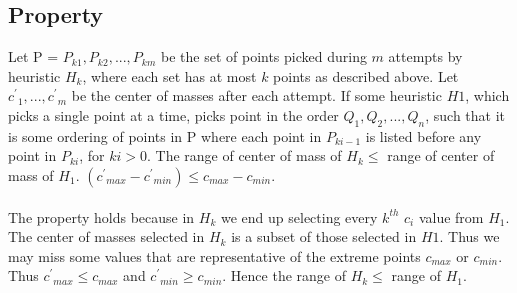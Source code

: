 \documentclass[11pt]{article} %
\begin{document}
\subsection{Property}
Let P = $P_{k1}, P_{k2}, ..., P_{km}$ be the set of points picked during $m$ attempts by heuristic $H_k$, where each set has at most $k$ points as described above. Let ${c^\prime}_1, ... , {c^\prime}_m$ be the center of masses after each attempt.  If some heuristic $H1$, which picks a single point at a time, picks point in the order $Q_1, Q_2, ... ,Q_n$, such that it is  some ordering of points in P where each point in $P_{ki-1}$ is listed before any point in $P_{ki}$, for $ki > 0$. The range of center of mass of $H_k \leq$ range of center of mass of $H_1$. $\left( {c^\prime}_{max} - {c^\prime}_{min} \right) \leq c_{max} - c_{min}.$ \\
\\
The property holds because in $H_k$ we end up selecting every $k^{th}$  $c_i$ value from $H_1$. The center of masses selected in $H_k$ is a subset of those selected in $H1$. Thus we may miss some values that are representative of the extreme points $c_{max}$ or $c_{min}$. Thus ${c^\prime}_{max} \leq c_{max}$ and  ${c^\prime}_{min} \geq c_{min}$. Hence the range of $H_k \leq$  range of $H_1$.
\end{document}
